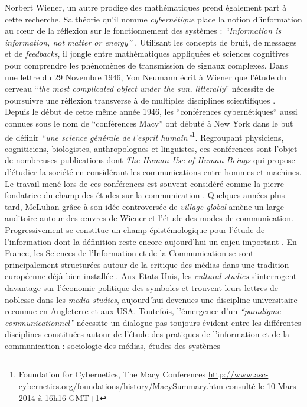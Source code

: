 Norbert Wiener, un autre prodige des mathématiques prend également part à cette recherche. Sa théorie qu{\textquoteright}il nomme \textit{cybernétique }place la notion d{\textquoteright}information au c{\oe}ur de la réflexion sur le fonctionnement des systèmes : \textit{{\textquotedblleft}Information is information, not matter or energy{\textquotedblright}} \citep[p. 155]{Neumann1948}. Utilisant les concepts de bruit, de messages et de \textit{feedbacks}, il jongle entre mathématiques appliquées et sciences cognitives pour comprendre les phénomènes de transmission de signaux complexes. Dans une lettre du 29 Novembre 1946, Von Neumann écrit à Wiener que l{\textquoteright}étude du cerveau {\textquotedblleft}\textit{the most complicated object under the sun, litterally}{\textquotedblright} nécessite de poursuivre une réflexion transverse à de multiples disciplines scientifiques \citep{Masani1990}. Depuis le début de cette m\^eme année 1946, les {\textquotedblleft}conférences cybernétiques{\textquotedblleft} aussi connues sous le nom de {\textquotedblleft}conférences Macy{\textquotedblright} ont débuté à New York dans le but de définir \textit{{\textquotedblleft}une science générale de l{\textquoteright}esprit humain{\textquotedblright}}\footnote{ Foundation for Cybernetics, The Macy Conferences \url{http://www.asc-cybernetics.org/foundations/history/MacySummary.htm} consulté le 10 Mars 2014 à 16h16 GMT+1}. Regroupant physiciens, cogniticiens, biologistes, anthropologues et linguistes, ces conférences sont l{\textquoteright}objet de nombreuses publications dont \textit{The Human Use of Human Beings} \citep{Wiener1988} qui propose d{\textquoteright}étudier la société en considérant les communications entre hommes et machines. Le travail mené lors de ces conférences est souvent considéré comme la pierre fondatrice du champ des études sur la communication \citep{Breton1997, Winkin1981}. Quelques années plus tard, McLuhan grâce à son idée controversée de \textit{village global} \citep{McLuhan1962} amène un large auditoire autour des {\oe}uvres de Wiener et l{\textquoteright}étude des modes de communication. Progressivement se constitue un champ épistémologique pour l{\textquoteright}étude de l{\textquoteright}information dont la définition reste encore aujourd{\textquoteright}hui un enjeu important \citep{Wolton1997}. En France, les Sciences de l{\textquoteright}Information et de la Communication se sont principalement structurées autour de la critique des médias \citep{Mattelart1986, Debray1991} dans une tradition européenne déjà bien installée \citep{Adorno2005}. Aux Etats-Unis, les \textit{cultural studies }\citep{Hall2003} s{\textquoteright}interrogent davantage sur l{\textquoteright}économie politique des symboles et trouvent leurs lettres de noblesse dans les \textit{media studies}, aujourd{\textquoteright}hui devenues une discipline universitaire reconnue en Angleterre et aux USA. Toutefois, l{\textquoteright}émergence d{\textquoteright}un \textit{{\textquotedblleft}paradigme communicationnel{\textquotedblright} }\citep{Bougnoux1993} nécessite un dialogue pas toujours évident entre les différentes disciplines constituées autour de l{\textquoteright}étude des pratiques de l{\textquoteright}information et de la communication : sociologie des médias, études des systèmes 